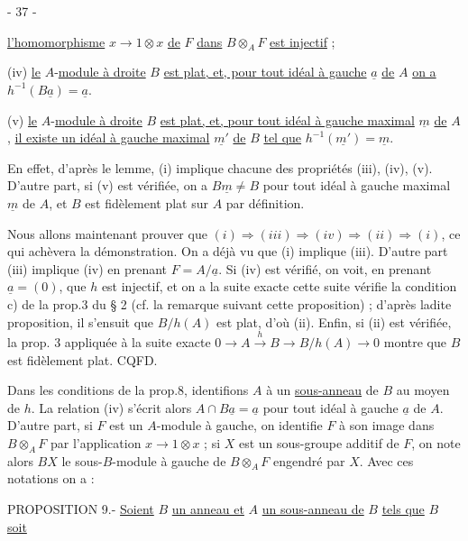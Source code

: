\begin{center}- 37 -\end{center}
\uline{l'homomorphisme} $x\longrightarrow1\otimes x$ \uline{de} $F$ \uline{dans} $B\otimes_A F$ \uline{est injectif} ;

(iv) \uline{le} $A$-\uline{module à droite} $B$ \uline{est plat, et, pour tout idéal à gauche} $\underline a$ \uline{de} $A$ \uline{on a} $h^{-1}(B\underline a)=\underline a$.

(v) \uline{le} $A$-\uline{module à droite} $B$ \uline{est plat, et, pour tout idéal à gauche maximal} $\underline m$ \uline{de} $A$, \uline{il existe un idéal à gauche maximal} $\underline{m'}$ \uline{de} $B$ \uline{tel que} $h^{-1}(\underline{m'})=\underline m$.

En effet, d'après le lemme, (i) implique chacune des propriétés (iii), (iv), (v). D'autre part, si (v) est vérifiée, on a $B\underline m\ne B$ pour tout idéal à gauche maximal $\underline m$ de $A$, et $B$ est fidèlement plat sur $A$ par définition.

Nous allons maintenant prouver que $(i)\Longrightarrow(iii)\Longrightarrow(iv)\Longrightarrow(ii)\Longrightarrow(i)$, ce qui achèvera la démonstration. On a déjà vu que (i) implique (iii). D'autre part (iii) implique (iv) en prenant $F=A/\underline a$. Si (iv) est vérifié, on voit, en prenant $\underline a=(0)$, que $h$ est injectif, et on a la suite exacte
cette suite vérifie la condition c) de la prop.3 du § 2 (cf. la remarque suivant cette proposition) ; d'après ladite proposition, il s'ensuit que $B/h(A)$ est plat, d'où (ii). Enfin, si (ii) est vérifiée, la prop. 3 appliquée à la suite exacte $0\longrightarrow A\xrightarrow{h}B\longrightarrow B/h(A)\longrightarrow0$ montre que $B$ est fidèlement plat. CQFD.

Dans les conditions de la prop.8, identifions $A$ à un \uline{sous-anneau} de $B$ au moyen de $h$. La relation (iv) s'écrit alors $A\cap B\underline a=\underline a$ pour tout idéal à gauche $\underline a$ de $A$. D'autre part, si $F$ est un $A$-module à gauche, on identifie $F$ à son image dans $B\otimes_A F$ par l'application $x\longrightarrow1\otimes x$ ; si $X$ est un sous-groupe additif de $F$, on note alors $BX$ le sous-$B$-module à gauche de $B\otimes_A F$ engendré par $X$. Avec ces notations on a :

PROPOSITION 9.- \uline{Soient} $B$ \uline{un anneau et} $A$ \uline{un sous-anneau de} $B$ \uline{tels que} $B$ \uline{soit}

